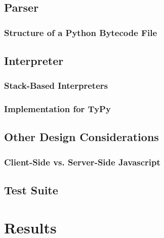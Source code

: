 \documentclass[10pt,a4paper]{article}
\begin{document}
\subsection{Parser}

\subsubsection{Structure of a Python Bytecode File}

\subsection{Interpreter}


\subsubsection{Stack-Based Interpreters} 

\subsubsection{Implementation for TyPy}

\subsection{Other Design Considerations}
\subsubsection{Client-Side vs. Server-Side Javascript}

\subsection{Test Suite}

\section{Results}
\end{document}
